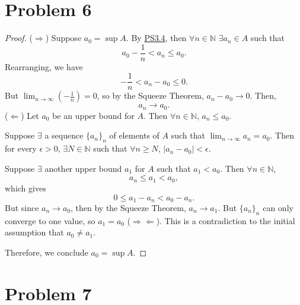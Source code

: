\documentclass{article}
\begin{document}
\section*{Problem 6}
\begin{proof}
	($\Rightarrow$) Suppose $a_0 = \sup{A}$. By \href{https://github.com/ovega14/RealAnalysis_solutions/blob/main/PS3/18.100A_ps3.pdf}{PS3.4}, then $\forall n \in \mathbb{N}$ $\exists a_n \in A$ such that 
	\begin{equation}
		a_0 - \frac{1}{n} < a_n \leq a_0.
	\end{equation}
	Rearranging, we have
	\begin{equation}
		-\frac{1}{n} < a_n - a_0 \leq 0.
	\end{equation}
	But $\lim_{n\to\infty}\left(-\frac{1}{n}\right)=0$, so by the Squeeze Theorem, $a_n - a_0 \rightarrow 0$. Then,
	\begin{equation}
		a_n \rightarrow a_0.
	\end{equation}
	($\Leftarrow$) Let $a_0$ be an upper bound for $A$. Then $\forall n \in \mathbb{N}$, $a_n \leq a_0$.
	
	Suppose $\exists$ a sequence $\{a_n\}_n$ of elements of $A$ such that $\lim_{n\to\infty}a_n = a_0$. Then for every $\epsilon > 0$, $\exists N\in\mathbb{N}$ such that $\forall n \geq N$, $|a_n - a_0| < \epsilon$.
	
	Suppose $\exists$ another upper bound $a_1$ for $A$ such that $a_1 < a_0$. Then $\forall n \in \mathbb{N}$, 
	\begin{equation}
		a_n \leq a_1 < a_0,
	\end{equation}
	which gives
	\begin{equation}
		0 \leq a_1 - a_n < a_0 - a_n.
	\end{equation}
	But since $a_n \rightarrow a_0$, then by the Squeeze Theorem, $a_n \rightarrow a_1$. But $\{a_n\}_n$ can only converge to one value, so $a_1 = a_0$ ($\Rightarrow\Leftarrow$). This is a contradiction to the initial assumption that $a_0\neq a_1$. 
	
	Therefore, we conclude $a_0=\sup{A}$.  
\end{proof}
\section*{Problem 7}
\end{document}
